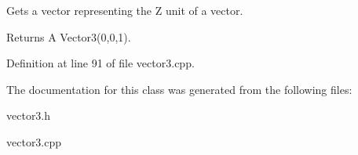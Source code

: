 Gets a vector representing the Z unit of a vector. 

\begin{DoxyReturn}{Returns}
A Vector3(0,0,1). 
\end{DoxyReturn}


Definition at line 91 of file vector3.cpp.



The documentation for this class was generated from the following files:\begin{DoxyCompactItemize}
\item 
vector3.h\item 
vector3.cpp\end{DoxyCompactItemize}
